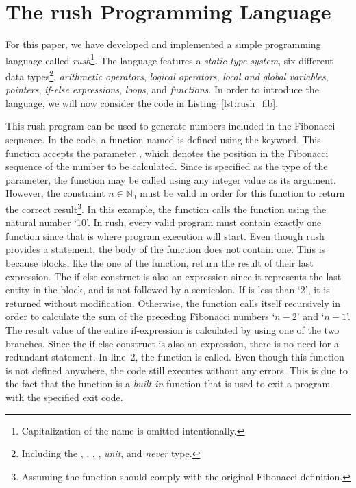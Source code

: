 \newpage %
\section{The rush Programming Language}

For this paper, we have developed and implemented a simple programming language called \emph{rush}\footnote{Capitalization of the name is omitted intentionally.}.
The language features a \emph{static type system}, six different data types\footnote{Including the , , , , \emph{unit}, and \emph{never} type.}, \emph{arithmetic operators}, \emph{logical operators}, \emph{local and global variables}, \emph{pointers}, \emph{if-else expressions}, \emph{loops}, and \emph{functions}.
In order to introduce the language, we will now consider the code in Listing~\ref{lst:rush_fib}.


This rush program can be used to generate numbers included in the Fibonacci sequence.
In the code, a function named  is defined using the  keyword.
This function accepts the parameter , which denotes the position in the Fibonacci sequence of the number to be calculated.
Since  is specified as the type of the parameter, the function may be called using any integer value as its argument.
However, the constraint $n \in \mathbb{N}_0$ must be valid in order for this function to return the correct result\footnote{Assuming the function should comply with the original Fibonacci definition.}.
In this example, the  function calls the  function using the natural number `10'.
In rush, every valid program must contain exactly one  function since that is where program execution will start.
Even though rush provides a  statement, the body of the  function does not contain one.
This is because blocks, like the one of the  function, return the result of their last expression.
The if-else construct is also an expression since it represents the last entity in the block, and is not followed by a semicolon.
If  is less than `2', it is returned without modification.
Otherwise, the function calls itself recursively in order to calculate the sum of the preceding Fibonacci numbers `$n - 2$' and `$n - 1$'.
The result value of the entire if-expression is calculated by using one of the two branches.
Since the if-else construct is also an expression, there is no need for a redundant  statement.
In line~2, the  function is called.
Even though this function is not defined anywhere, the code still executes without any errors.
This is due to the fact that the  function is a \emph{built-in} function that is used to exit a program with the specified exit code.

